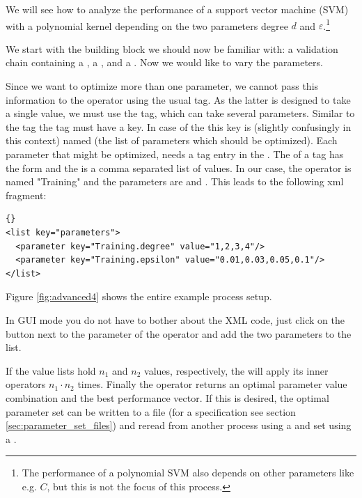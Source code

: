 We will see how to analyze the performance of a support vector machine
(SVM) with a polynomial kernel depending on the two parameters 
degree $d$ and $\varepsilon$.\footnote{The performance of a polynomial
SVM also depends on other parameters like e.g. $C$, but this is not
the focus of this process.}

We start with the building block we should now be familiar with: a validation
chain containing a , a , and a
. Now we would like to vary the parameters.

Since we want to optimize more than one parameter, we cannot pass this
information to the  operator using the usual
 tag. As the latter is designed to take a single
value, we must use the  tag, which can take several
parameters. Similar to the  tag the  tag
must have a key. In case of the  this key is
(slightly confusingly in this context) named  (the
list of parameters which should be optimized). Each parameter 
that might be optimized, needs a  tag entry in the .
The  of a   tag has the form
 and the  is a comma
separated list of values. In our case, the operator is named
"Training" and the parameters are  and
. This leads to the following xml fragment:
\medskip

\begin{lstlisting}[style=rapidminerxmlstyle]{}
<list key="parameters">
  <parameter key="Training.degree" value="1,2,3,4"/>
  <parameter key="Training.epsilon" value="0.01,0.03,0.05,0.1"/>
</list>
\end{lstlisting}

Figure \ref{fig:advanced4} shows the entire example process setup.


In GUI mode you do not have to bother about the XML code, just click
on the  button next to the 
parameter of the  operator and add the two
parameters to the list.

If the value lists hold $n_1$ and $n_2$ values, respectively, the
 will apply its inner operators $n_1\cdot
n_2$ times. Finally the  operator returns an
optimal parameter value combination and the best performance
vector. If this is desired, the optimal parameter set can be written
to a file (for a specification see section
\ref{sec:parameter_set_files}) and reread from another process
using a  and set using a
.
\medskip

